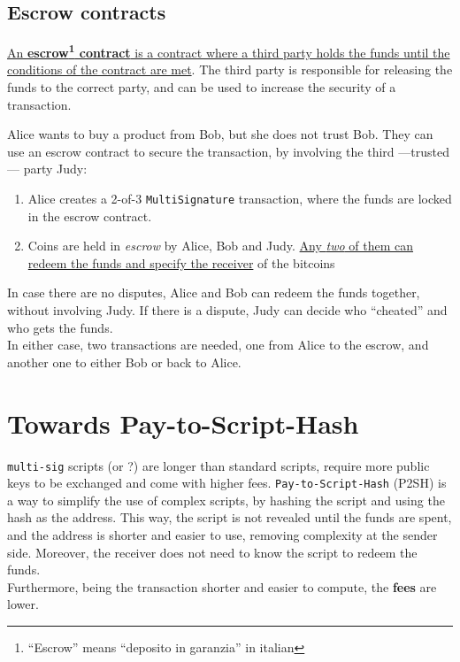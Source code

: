 \subsection{Escrow contracts}
\ul{An \textbf{escrow\footnote{``Escrow'' means ``deposito in garanzia'' in italian} contract} is a contract where a third party holds the funds until the conditions of the contract are met}. The third party is responsible for releasing the funds to the correct party, and can be used to increase the security of a transaction.

Alice wants to buy a product from Bob, but she does not trust Bob. They can use an escrow contract to secure the transaction, by involving the third ---trusted--- party Judy:
\begin{enumerate}
   \item Alice creates a 2-of-3 \texttt{MultiSignature} transaction, where the funds are locked in the escrow contract.
   \item Coins are held in \textit{escrow} by Alice, Bob and Judy. \ul{Any \textit{two} of them can redeem the funds and specify the receiver} of the bitcoins
\end{enumerate}
In case there are no disputes, Alice and Bob can redeem the funds together, without involving Judy. If there is a dispute, Judy can decide who ``cheated'' and who gets the funds.\\
In either case, two transactions are needed, one from Alice to the escrow, and another one to either Bob or back to Alice.

\section{Towards Pay-to-Script-Hash}

\texttt{multi-sig} scripts (or ?) are longer than standard scripts, require more public keys to be exchanged and come with higher fees.
\texttt{Pay-to-Script-Hash} (P2SH) is a way to simplify the use of complex scripts, by hashing the script and using the hash as the address. This way, the script is not revealed until the funds are spent, and the address is shorter and easier to use, removing complexity at the sender side. Moreover, the receiver does not need to know the script to redeem the funds.\\
Furthermore, being the transaction shorter and easier to compute, the \textbf{fees} are lower.

